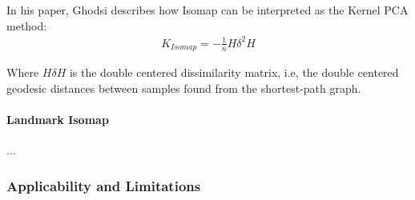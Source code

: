 \documentclass[12pt]{article}
\begin{document}
In his paper, Ghodsi describes how Isomap can be interpreted as the Kernel PCA method: \cite{gho2006}
\begin{align*}
K_{Isomap} = -\frac{1}{n}H \delta^2 H
\end{align*}

Where $H \delta H$ is the double centered dissimilarity matrix, i.e, the double centered geodesic distances between samples found from the shortest-path graph.

\paragraph{Landmark Isomap}

...

\subsubsection{Applicability and Limitations}
\end{document}
